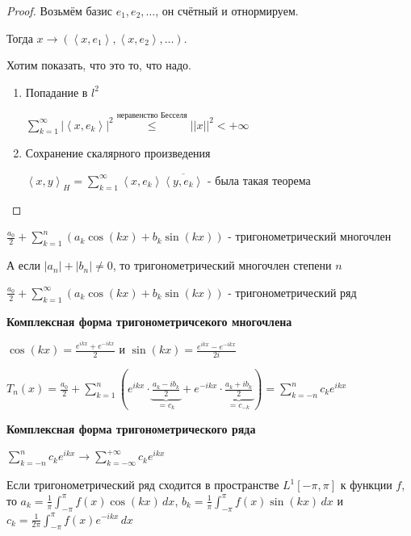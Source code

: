 \begin{proof}
    Возьмём базис $e_1, e_2, \ldots$, он счётный и отнормируем.
    
    Тогда $x \rightarrow (\left < x, e_1 \right >, \left < x, e_2 \right >, \ldots)$.
    
    Хотим показать, что это то, что надо.

    \begin{enumerate}
        \item {
            Попадание в $l^2$

            $\sum\limits_{k = 1}^\infty |\left < x, e_k \right >|^2 \overset{\text{неравенство Бесселя}}{\leqslant} ||x||^2 < +\infty$
        }
        \item {
            Сохранение скалярного произведения

            $\left < x, y \right >_H = \sum\limits_{k = 1}^\infty \left < x, e_k \right > \overline{\left < y, e_k \right >}$ - была такая теорема
         }
    \end{enumerate}
\end{proof}


\begin{definition}
    $\frac{a_0}{2} + \sum_{k = 1}^n (a_k \cos (kx) + b_k \sin (kx))$ - тригонометрический многочлен

    А если $|a_n| + |b_n| \neq 0$, то тригонометрический многочлен степени $n$
\end{definition}

\begin{definition}
    $\frac{a_0}{2} + \sum_{k=1}^\infty (a_k \cos (kx) + b_k \sin (kx))$ - тригонометрический ряд
\end{definition}

\textbf{Комплексная форма тригонометричсекого многочлена}

$\cos (kx) = \frac{e^{ikx} + e^{-ikx}}{2}$ и $\sin (kx) = \frac{e^{ikx} - e^{-ikx}}{2i}$

$T_n (x) = \frac{a_0}{2} + \sum_{k = 1}^n \left ( e^{ikx} \cdot \underbrace{\frac{a_k - ib_k}{2}}_{=c_k} + e^{-ikx} \cdot \underbrace{\frac{a_k + ib_k}{2}}_{=c_{-k}} \right ) = \sum_{k = -n}^n c_k e^{ikx}$

\textbf{Комплексная форма тригонометрического ряда}

$\sum_{k = -n}^n c_k e^{ikx} \rightarrow \sum_{k = -\infty}^{+\infty} c_k e^{ikx}$

\begin{theorem}
    Если тригонометрический ряд сходится в пространстве $L^1 [-\pi, \pi]$ к функции $f$, то
    $a_k = \frac{1}{\pi} \int_{-\pi}^\pi f(x) \cos (kx) \, dx$, $b_k = \frac{1}{\pi} \int_{-\pi}^\pi f(x) \sin (kx) \, dx$ и 
    $c_k = \frac{1}{2\pi} \int_{-\pi}^\pi f(x) e^{-ikx} \, dx$
\end{theorem}

